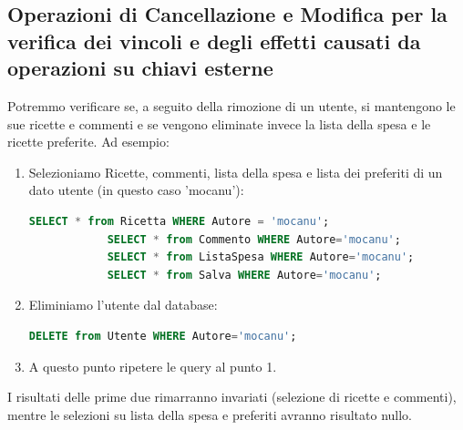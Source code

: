 \documentclass[12pt]{extarticle}
\begin{document}
\subsection{Operazioni di Cancellazione e Modifica per la verifica dei vincoli e degli effetti causati da operazioni su chiavi esterne}
Potremmo verificare se, a seguito della rimozione di un utente, si mantengono le sue
ricette e commenti e se vengono eliminate invece la lista della spesa e le ricette preferite.
Ad esempio:
\begin{enumerate}
    \item Selezioniamo Ricette, commenti, lista della spesa e lista dei preferiti di un dato
    utente (in questo caso 'mocanu'):
        \begin{lstlisting}[language=SQL]
            SELECT * from Ricetta WHERE Autore = 'mocanu';
            SELECT * from Commento WHERE Autore='mocanu';
            SELECT * from ListaSpesa WHERE Autore='mocanu';
            SELECT * from Salva WHERE Autore='mocanu';
        \end{lstlisting}
    \item Eliminiamo l’utente dal database:
        \begin{lstlisting}[language=SQL]
            DELETE from Utente WHERE Autore='mocanu';
        \end{lstlisting}
    \item A questo punto ripetere le query al punto 1.
    
\end{enumerate}

I risultati delle prime due rimarranno invariati (selezione di ricette e commenti),
mentre le selezioni su lista della spesa e preferiti avranno risultato nullo.
\end{document}
